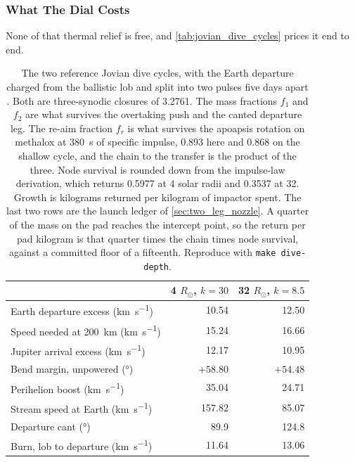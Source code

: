 \documentclass{article}
\begin{document}
\subsubsection{What The Dial Costs}\label{sec:depth_cost}
None of that thermal relief is free, and \autoref{tab:jovian_dive_cycles} prices it end to end.

\begin{table}[!htpb]
    \centering
    \caption{The two reference Jovian dive cycles, with the Earth departure charged from the ballistic lob and split into two pulses five days apart \cite{Katz_aim_is_all_you_need_2025}. Both are three-synodic closures of \SI{3.2761}{\year}. The mass fractions $f_1$ and $f_2$ are what survives the overtaking push and the canted departure leg. The re-aim fraction $f_r$ is what survives the apoapsis rotation on methalox at \SI{380}{\second} of specific impulse, \num{0.893} here and \num{0.868} on the shallow cycle, and the chain to the transfer is the product of the three. Node survival is rounded down from the impulse-law derivation, which returns \num{0.5977} at 4 solar radii and \num{0.3537} at 32. Growth is kilograms returned per kilogram of impactor spent. The last two rows are the launch ledger of \autoref{sec:two_leg_nozzle}. A quarter of the mass on the pad reaches the intercept point, so the return per pad kilogram is that quarter times the chain times node survival, against a committed floor of a fifteenth. Reproduce with \texttt{make dive-depth}.}
    \label{tab:jovian_dive_cycles}
    \begin{tabular}{|l|r|r|}\hline
        & \textbf{4 $R_\odot$, $k = 30$} & \textbf{32 $R_\odot$, $k = 8.5$} \\\hline
        Earth departure excess (\si{\kilo\meter\per\second}) & 10.54 & 12.50 \\\hline
        Speed needed at \SI{200}{\kilo\meter} (\si{\kilo\meter\per\second}) & 15.24 & 16.66 \\\hline
        Jupiter arrival excess (\si{\kilo\meter\per\second}) & 12.17 & 10.95 \\\hline
        Bend margin, unpowered (\si{\degree}) & $+58.80$ & $+54.48$ \\\hline
        Perihelion boost (\si{\kilo\meter\per\second}) & 35.04 & 24.71 \\\hline
        Stream speed at Earth (\si{\kilo\meter\per\second}) & 157.82 & 85.07 \\\hline
        Departure cant (\si{\degree}) & 89.9 & 124.8 \\\hline
        Burn, lob to departure (\si{\kilo\meter\per\second}) & 11.64 & 13.06 \\\hline

\end{tabular}
\end{table}
\end{document}
